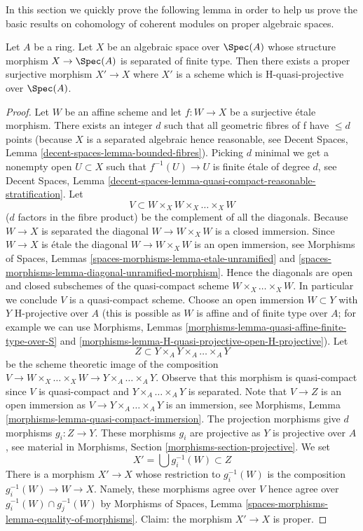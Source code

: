 \noindent
In this section we quickly prove the following lemma in order
to help us prove the basic results on cohomology of coherent
modules on proper algebraic spaces.

\begin{lemma}
\label{lemma-weak-chow}
Let $A$ be a ring. Let $X$ be an algebraic space over $\Spec(A)$
whose structure morphism $X \to \Spec(A)$ is separated of finite type.
Then there exists a proper surjective morphism $X' \to X$
where $X'$ is a scheme which is H-quasi-projective over $\Spec(A)$.
\end{lemma}

\begin{proof}
Let $W$ be an affine scheme and let $f : W \to X$ be a surjective
\'etale morphism. There exists an integer $d$ such that all geometric
fibres of f have $\leq d$ points (because $X$ is a separated algebraic
hence reasonable, see
Decent Spaces, Lemma \ref{decent-spaces-lemma-bounded-fibres}).
Picking $d$ minimal we get a nonempty open $U \subset X$ such that
$f^{-1}(U) \to U$ is finite \'etale of degree $d$, see
Decent Spaces, Lemma
\ref{decent-spaces-lemma-quasi-compact-reasonable-stratification}.
Let
$$
V \subset W \times_X W \times_X \ldots \times_X W
$$
($d$ factors in the fibre product) be the complement of all the diagonals.
Because $W \to X$ is separated the diagonal $W \to W \times_X W$ is a
closed immersion. Since $W \to X$ is \'etale the diagonal
$W \to W \times_X W$ is an open immersion, see
Morphisms of Spaces, Lemmas
\ref{spaces-morphisms-lemma-etale-unramified} and
\ref{spaces-morphisms-lemma-diagonal-unramified-morphism}.
Hence the diagonals are open and closed subschemes
of the quasi-compact scheme $W \times_X \ldots \times_X W$.
In particular we conclude $V$ is a quasi-compact scheme.
Choose an open immersion $W \subset Y$ with $Y$ H-projective over
$A$ (this is possible as $W$ is affine and of finite type over $A$;
for example we can use
Morphisms, Lemmas
\ref{morphisms-lemma-quasi-affine-finite-type-over-S} and
\ref{morphisms-lemma-H-quasi-projective-open-H-projective}).
Let
$$
Z \subset Y \times_A Y \times_A \ldots \times_A Y
$$
be the scheme theoretic image of the composition
$V \to W \times_X \ldots \times_X W \to Y \times_A \ldots \times_A Y$.
Observe that this morphism is quasi-compact since $V$ is quasi-compact
and $Y \times_A \ldots \times_A Y$ is separated.
Note that $V \to Z$ is an open immersion as
$V \to Y \times_A \ldots \times_A Y$ is an immersion, see
Morphisms, Lemma \ref{morphisms-lemma-quasi-compact-immersion}.
The projection morphisms give $d$ morphisms $g_i : Z \to Y$.
These morphisms $g_i$ are projective as $Y$ is projective over $A$, see
material in Morphisms, Section \ref{morphisms-section-projective}.
We set
$$
X' = \bigcup g_i^{-1}(W) \subset Z
$$
There is a morphism $X' \to X$ whose restriction to $g_i^{-1}(W)$ is
the composition $g_i^{-1}(W) \to W \to X$.
Namely, these morphisms agree over $V$ hence agree over
$g_i^{-1}(W) \cap g_j^{-1}(W)$ by
Morphisms of Spaces, Lemma \ref{spaces-morphisms-lemma-equality-of-morphisms}.
Claim: the morphism $X' \to X$ is proper.


\end{proof}
